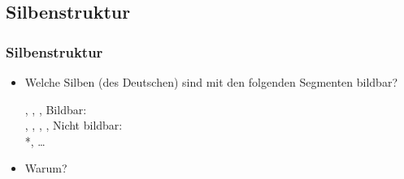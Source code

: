 \subsection{Silbenstruktur}
%
\begin{frame}
\frametitle{Silbenstruktur}

\begin{itemize}
	\item Welche Silben (des Deutschen) sind mit den folgenden Segmenten bildbar?
	
	  \ea
          \textipa{[p]}, \textipa{[a]}, \textipa{[l]}, \textipa{[t]}
          \z
\pause	
\eal
\ex Bildbar:\\
	\textipa{[palt]}, \textipa{[alpt]}, \textipa{[lapt]}, \textipa{[talp]}, \textipa{[plat]}
\ex Nicht bildbar:\\
	*\textipa{[ltap]}, \dots\
\zl
\pause
	\item Warum?
\end{itemize}

\end{frame}



